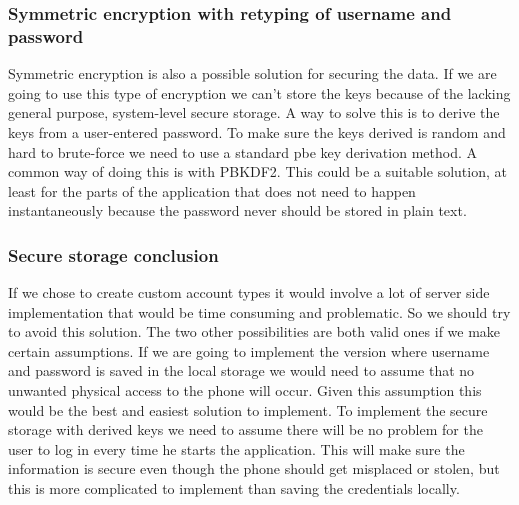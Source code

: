 \subsubsection{Symmetric encryption with retyping of username and password}
Symmetric encryption is also a possible solution for securing the data. If we are going to use this type of encryption we can’t store the keys because of the lacking general purpose, system-level secure storage.
\newline
\newline
A way to solve this is to derive the keys from a user-entered password. To make sure the keys derived is random and hard to brute-force we need to use a standard \gls{pbe} key derivation method. A common way of doing this is with PBKDF2.
\newline
\newline
This could be a suitable solution, at least for the parts of the application that does not need to happen instantaneously because the password never should be stored in plain text.

\subsubsection{Secure storage conclusion}
If we chose to create custom account types it would involve a lot of server side implementation that would be time consuming and problematic. So we should try to avoid this solution. The two other possibilities are both valid ones if we make certain assumptions.
\newline
\newline
If we are going to implement the version where username and password is saved in the local storage we would need to assume that no unwanted physical access to the phone will occur. Given this assumption this would be the best and easiest solution to implement.
\newline
\newline
To implement the secure storage with derived keys we need to assume there will be no problem for the user to log in every time he starts the application. This will make sure the information is secure even though the phone should get misplaced or stolen, but this is more complicated to implement than saving the credentials locally.


